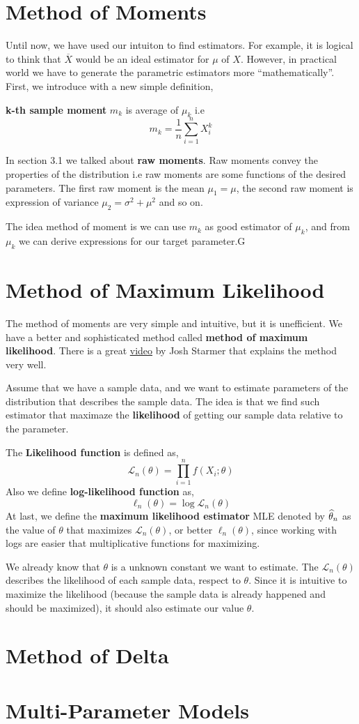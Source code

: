 \section{Method of Moments}
Until now, we have used our intuiton to find estimators. For example, it is logical to think that $\overline{X}$ would be an ideal estimator for $\mu$ of $X$. However, in practical world we have to generate the parametric estimators more ``mathematically''.
First, we introduce with a new simple definition,
\begin{definition}
    \textbf{k-th sample moment} $m_k$ is average of $\mu_{k}$ i.e 
    \[m_k = \frac{1}{n} \sum_{i = 1}^n X_{i}^k \]
\end{definition}
In section 3.1 we talked about \textbf{raw moments}. Raw moments convey the properties of the distribution i.e raw moments are some functions of the desired parameters. The first raw moment is the mean $\mu_1 = \mu$, the second raw moment is expression of variance  $\mu_{2}= \sigma^2+ \mu^2$ and so on.

The idea method of moment is  we can use $m_k$ as good estimator of $\mu_k$, and from $\mu_k$ we can derive expressions for our target parameter.G
\section{Method of Maximum Likelihood}
The method of moments are very simple and intuitive, but it is unefficient. We have a better and sophisticated method called 
\textbf{method of maximum likelihood}. There is a great \href{https://www.youtube.com/watch?v=XepXtl9YKwc}{video}  by Josh Starmer that explains the method very well.

Assume that we have a sample data, and we want to estimate parameters of the distribution that describes the sample data. The idea is that we find such estimator that maximaze the \textbf{likelihood} of getting our sample data relative to the parameter.
\begin{definition}
    The \textbf{Likelihood function} is defined as,
    \[ \mathcal{L}_n(\theta) = \prod_{i=1}^n f(X_i; \theta) \]
    Also we define \textbf{log-likelihood function} as,
    \[\ell_n( \theta) = \log \mathcal{L}_n(\theta) \]
    At last, we define the \textbf{maximum likelihood estimator} MLE denoted by ${\widehat{\theta}}_n$ as the value of $\theta$ that maximizes $\mathcal{L}_n(\theta)$, or better $\ell_n( \theta)$, since working with logs are easier that multiplicative functions for maximizing.
\end{definition}
We already know that $\theta$ is a unknown constant we want to estimate. The $\mathcal{L}_n(\theta)$ describes the likelihood of each sample data, respect to $\theta$. Since it is intuitive to maximize the likelihood (because the sample data is already happened and should be maximized), it should also estimate our value $\theta$.

\section{Method of Delta}
\section{Multi-Parameter Models}

